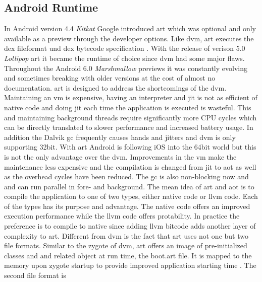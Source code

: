\subsection{Android Runtime} \label{subsection:android-art}
In Android version 4.4 \textit{Kitkat} Google introduced \gls{art} which was optional and only available as a preview through the developer options.
Like \gls{dvm}, \gls{art} executes the \gls{dex} fileformat und \gls{dex} bytecode specification \cite{androidArt}.
With the release of verison 5.0 \textit{Lollipop} \gls{art} it became the runtime of choice since \gls{dvm} had some major flaws.
Throughout the Android 6.0 \textit{Marshmallow} previews it was constantly evolving and sometimes breaking with older versions at the cost of almost no documentation.
\newline
\gls{art} is designed to address the shortcomings of the \gls{dvm}.
Maintaining an \gls{vm} is expensive, having an interpreter and \gls{jit} is not as efficient of native code and doing \gls{jit} each time the application is executed is wasteful.
This and maintaining background threads require significantly more CPU cycles which can be directly translated to slower performance and increased battery usage.
In addition the Dalvik \gls{gc} frequently causes hands and jitters and \gls{dvm} is only supporting 32bit.
With \gls{art} Android is following iOS into the 64bit world but this is not the only advantage over the \gls{dvm}.
Improvements in the \gls{vm} make the maintenance less expensive and the compilation is changed from \gls{jit} to \gls{aot} as well as the overhead cycles have been reduced.
The \gls{gc} is also non-blocking now and and can run parallel in fore- and background.
\newline
The mean idea of \gls{art} and \gls{aot} is to compile the application to one of two types, either native code or \gls{llvm} code.
Each of the types has its purpose and advantage.
The native code offers an improved execution performance while the \gls{llvm} code offers protability.
In practice the preference is to compile to native since adding \gls{llvm} bitcode adds another layer of complexity to \gls{art}.
\newline
Different from \gls{dvm} is the fact that \gls{art} uses not one but two file formats.
Similar to the zygote of \gls{dvm}, \gls{art} offers an image of pre-initialized classes and and related object at run time, the boot.art file.
It is mapped to the memory upon zygote startup to provide improved application starting time \cite{developersConfigureArt}.
The second file format is




